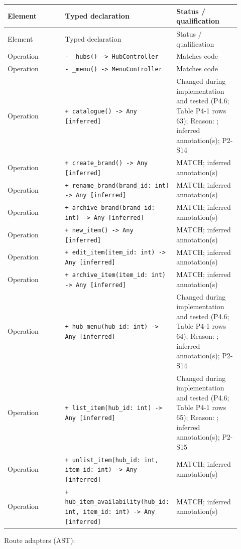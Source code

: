 \begin{longtable}{>{\raggedright\arraybackslash}p{0.3067\linewidth}>{\raggedright\arraybackslash}p{0.3067\linewidth}>{\raggedright\arraybackslash}p{0.3067\linewidth}}
Element & Typed declaration & Status / qualification \\
\hline\endfirsthead
Element & Typed declaration & Status / qualification \\
\hline\endhead
Operation & \texttt{- \_\allowbreak{}hubs() -\textgreater{} HubController} & Matches code \\
Operation & \texttt{- \_\allowbreak{}menu() -\textgreater{} MenuController} & Matches code \\
Operation & \texttt{+ catalogue() -\textgreater{} Any [inferred] } & Changed during implementation and tested (P4.6; Table P4-1 rows 63); Reason: ; inferred annotation(s); P2-S14 \\
Operation & \texttt{+ create\_\allowbreak{}brand() -\textgreater{} Any [inferred]} & MATCH; inferred annotation(s) \\
Operation & \texttt{+ rename\_\allowbreak{}brand(brand\_\allowbreak{}id: int) -\textgreater{} Any [inferred]} & MATCH; inferred annotation(s) \\
Operation & \texttt{+ archive\_\allowbreak{}brand(brand\_\allowbreak{}id: int) -\textgreater{} Any [inferred]} & MATCH; inferred annotation(s) \\
Operation & \texttt{+ new\_\allowbreak{}item() -\textgreater{} Any [inferred]} & MATCH; inferred annotation(s) \\
Operation & \texttt{+ edit\_\allowbreak{}item(item\_\allowbreak{}id: int) -\textgreater{} Any [inferred]} & MATCH; inferred annotation(s) \\
Operation & \texttt{+ archive\_\allowbreak{}item(item\_\allowbreak{}id: int) -\textgreater{} Any [inferred]} & MATCH; inferred annotation(s) \\
Operation & \texttt{+ hub\_\allowbreak{}menu(hub\_\allowbreak{}id: int) -\textgreater{} Any [inferred] } & Changed during implementation and tested (P4.6; Table P4-1 rows 64); Reason: ; inferred annotation(s); P2-S14 \\
Operation & \texttt{+ list\_\allowbreak{}item(hub\_\allowbreak{}id: int) -\textgreater{} Any [inferred] } & Changed during implementation and tested (P4.6; Table P4-1 rows 65); Reason: ; inferred annotation(s); P2-S15 \\
Operation & \texttt{+ unlist\_\allowbreak{}item(hub\_\allowbreak{}id: int, item\_\allowbreak{}id: int) -\textgreater{} Any [inferred]} & MATCH; inferred annotation(s) \\
Operation & \texttt{+ hub\_\allowbreak{}item\_\allowbreak{}availability(hub\_\allowbreak{}id: int, item\_\allowbreak{}id: int) -\textgreater{} Any [inferred]} & MATCH; inferred annotation(s) \\
\end{longtable}
Route adapters (AST):

